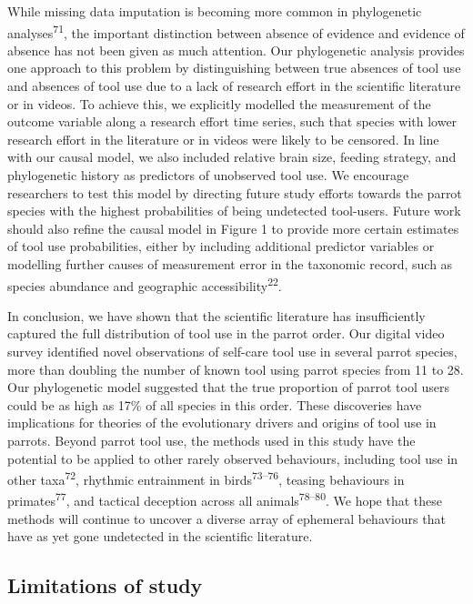 \documentclass[
  man, donotrepeattitle,floatsintext]{apa6}
\begin{document}
While missing data imputation is becoming more common in phylogenetic
analyses\textsuperscript{71}, the important distinction between absence of
evidence and evidence of absence has not been given as much attention. Our
phylogenetic analysis provides one approach to this problem by distinguishing
between true absences of tool use and absences of tool use due to a lack of
research effort in the scientific literature or in videos. To achieve this, we
explicitly modelled the measurement of the outcome variable along a research
effort time series, such that species with lower research effort in the
literature or in videos were likely to be censored. In line with our causal
model, we also included relative brain size, feeding strategy, and phylogenetic
history as predictors of unobserved tool use. We encourage researchers to test
this model by directing future study efforts towards the parrot species with the
highest probabilities of being undetected tool-users. Future work should also
refine the causal model in Figure 1 to provide more certain
estimates of tool use probabilities, either by including additional predictor
variables or modelling further causes of measurement error in the taxonomic
record, such as species abundance and geographic accessibility\textsuperscript{22}.

In conclusion, we have shown that the scientific literature has insufficiently
captured the full distribution of tool use in the parrot order. Our
digital video survey identified novel observations of self-care tool use in
several parrot species, more than doubling the number of known tool using parrot
species from 11 to 28. Our phylogenetic model suggested that the true
proportion of parrot tool users could be as high as 17\% of all species in this
order. These discoveries have implications for theories of the evolutionary
drivers and origins of tool use in parrots. Beyond parrot tool use, the
methods used in this study have the potential to be applied to other rarely
observed behaviours, including tool use in other taxa\textsuperscript{72}, rhythmic
entrainment in birds\textsuperscript{73--76},
teasing behaviours in primates\textsuperscript{77}, and tactical deception across all
animals\textsuperscript{78--80}. We hope that these methods
will continue to uncover a diverse array of ephemeral behaviours that have as
yet gone undetected in the scientific literature.

\hypertarget{limitations-of-study}{%
\subsection{Limitations of study}\label{limitations-of-study}}
\end{document}
